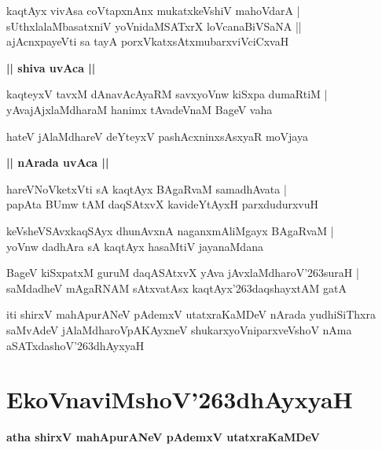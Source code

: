 \documentclass[twoside,12pt,openright]{book}
\def\S{\char'263}
\newcounter{shloka}[chapter]
\def\uvaca#1{\centerline{{\large\textbf{#1}}}}
\begin{document}
\begin{shloka}%
kaqtAyx vivAsa coVtapxnAnx mukatxkeVshiV mahoVdarA |\\
sUthxlalaMbasatxniV yoVnidaMSATxrX loVcanaBiVSaNA ||\\
ajAcnxpayeVti sa tayA porxVkatxsAtxmubarxviVciCxvaH 
\end{shloka}

\uvaca{|| shiva uvAca ||}

\begin{shloka}%
kaqteyxV tavxM dAnavAcAyaRM savxyoVnw kiSxpa dumaRtiM |\\
yAvajAjxlaMdharaM hanimx tAvadeVnaM BageV vaha 
\end{shloka}

\begin{shloka}%
hateV jAlaMdhareV deYteyxV pashAcxninxsAsxyaR moVjaya 
\end{shloka}

\uvaca{|| nArada uvAca ||}

\begin{shloka}%
hareVNoVketxVti sA kaqtAyx BAgaRvaM samadhAvata |\\
papAta BUmw tAM daqSAtxvX kavideYtAyxH parxdudurxvuH 
\end{shloka}

\begin{shloka}%
keVsheVSAvxkaqSAyx dhunAvxnA naganxmAliMgayx BAgaRvaM |\\
yoVnw dadhAra sA kaqtAyx hasaMtiV jayanaMdana 
\end{shloka}

\begin{shloka}%
BageV kiSxpatxM guruM daqASAtxvX yAva jAvxlaMdharoV\S suraH |\\
saMdadheV mAgaRNAM sAtxvatAsx kaqtAyx\S daqshayxtAM gatA 
\end{shloka}

\begin{center}
iti shirxV mahApurANeV pAdemxV utatxraKaMDeV  nArada yudhiSiThxra saMvAdeV jAlaMdharoVpAKAyxneV 
shukarxyoVniparxveVshoV nAma aSATxdashoV\S dhAyxyaH 
\end{center}

\chapter{EkoVnaviMshoV\S dhAyxyaH}

\begin{center}
{\LARGE\bfseries atha shirxV mahApurANeV pAdemxV utatxraKaMDeV} 
\end{center}
\end{document}
